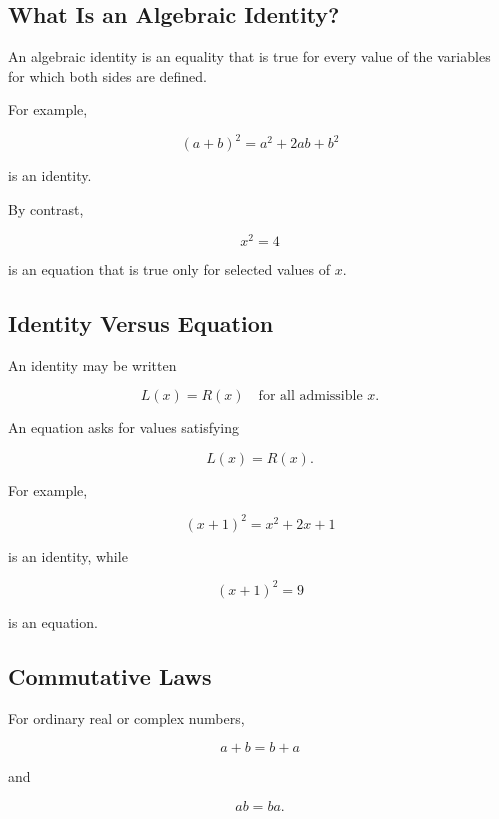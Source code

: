 \subsection{What Is an Algebraic Identity?}
\label{subsec:what-is-algebraic-identity}

An algebraic identity is an equality that is true for every value of the
variables for which both sides are defined.

For example,

\[
\boxed{
(a+b)^2
=
a^2+2ab+b^2
}
\]

is an identity.

By contrast,

\[
x^2=4
\]

is an equation that is true only for selected values of \(x\).

\subsection{Identity Versus Equation}
\label{subsec:identity-versus-equation}

An identity may be written

\[
\boxed{
L(x)=R(x)
\quad
\text{for all admissible }x.
}
\]

An equation asks for values satisfying

\[
\boxed{
L(x)=R(x).
}
\]

For example,

\[
\boxed{
(x+1)^2
=
x^2+2x+1
}
\]

is an identity, while

\[
\boxed{
(x+1)^2=9
}
\]

is an equation.

\subsection{Commutative Laws}
\label{subsec:commutative-laws-reference}

For ordinary real or complex numbers,

\[
\boxed{
a+b=b+a
}
\]

and

\[
\boxed{
ab=ba.
}
\]

